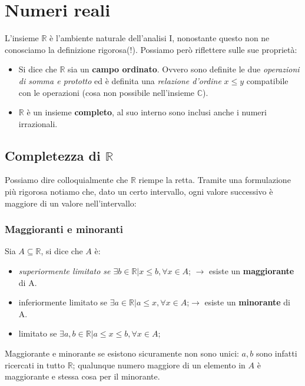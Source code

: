 \documentclass[x11names]{article}
\begin{document}
\newpage
\section{Numeri reali}
L'insieme $\mathbb{R}$ è l'ambiente naturale dell'analisi I, nonostante questo non ne conosciamo la definizione rigorosa(!). Possiamo però riflettere sulle sue proprietà:
\begin{itemize}
    \item Si dice che $\mathbb{R}$ sia un \textbf{campo ordinato}. Ovvero sono definite le due \textit{operazioni di somma e prototto} ed è definita una \textit{relazione d'ordine} $x \leq y$ compatibile con le operazioni (cosa non possibile nell'insieme $\mathbb{C}$).
    \item $\mathbb{R}$ è un insieme \textbf{completo}, al suo interno sono inclusi anche i numeri irrazionali.
\end{itemize}

\noindent
\subsection{Completezza di $\mathbb{R}$}

Possiamo dire colloquialmente che $\mathbb{R}$ riempe la retta. Tramite una formulazione più rigorosa notiamo che, dato un certo intervallo, ogni valore successivo è maggiore di un valore nell'intervallo:
\subsubsection{Maggioranti e minoranti}
\noindent
Sia $A \subseteq \mathbb{R}$, si dice che $A$ è:
\begin{itemize}
    \item \textit{superiormente limitato se  $\exists b \in \mathbb{R} | x \leq b, \forall x \in A$}; $\longrightarrow$ esiste un \textbf{maggiorante} di A.
    \item inferiormente limitato se $\exists a \in \mathbb{R} | a \leq x, \forall x \in A$;$\longrightarrow$ esiste un \textbf{minorante} di A.
    \item limitato se $\exists a,b \in \mathbb{R} | a \leq x \leq b, \forall x \in A$;
\end{itemize}

\noindent
Maggiorante e minorante se esistono sicuramente non sono unici: $a,b$ sono infatti ricercati in tutto $\mathbb{R}$; qualunque numero maggiore di un elemento in $A$ è maggiorante e stessa cosa per il minorante.
\end{document}
